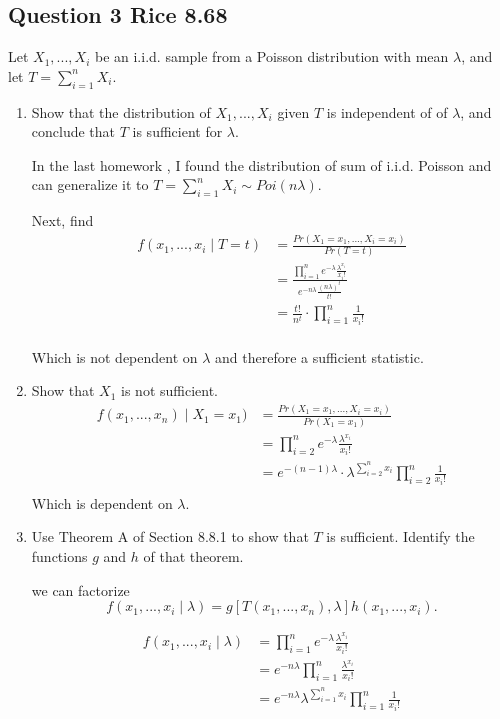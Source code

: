 \documentclass{tufte-book}
\theoremstyle{mytheoremstyle}
\theoremstyle{mylemstyle}
\theoremstyle{mydefstyle}
\begin{document}
\subsection{Question 3 Rice 8.68}
Let $X_1,...,X_i$ be an i.i.d. sample from a Poisson distribution with mean $\lambda$, and let $T=\sum_{i=1}^nX_i$.

\begin{enumerate}

\item Show that the distribution of $X_1,...,X_i$ given $T$ is independent of of $\lambda$, and conclude that $T$ is sufficient for $\lambda$.

In the last homework , I found the distribution of sum of i.i.d. Poisson and can generalize it to $T=\sum_{i=1}^nX_i \sim Poi(n\lambda)$.

Next, find
\begin{align*}
f(x_1,...,x_i\mid T=t) &= \frac{Pr(X_1=x_1,...,X_i=x_i)}{Pr(T=t)}\\
&= \frac{\prod_{i=1}^n e^{-\lambda} \frac{\lambda^{x_i}}{x_i!}}{e^{-n\lambda} \frac{(n\lambda)^t}{t!}}\\
&= \frac{t!}{n^t} \cdot \prod_{i=1}^n \frac{1}{x_i!}\\
\end{align*}

Which is not dependent on $\lambda$ and therefore a sufficient statistic.

\item Show that $X_1$ is not sufficient.
\begin{align*}
f(x_1,...,x_n) \mid X_1=x_1) &= \frac{Pr(X_1=x_1,...,X_i=x_i)}{Pr(X_1=x_1)}\\
&= \prod_{i=2}^n e^{-\lambda} \frac{\lambda^{x_i}}{x_i!}\\
&= e^{-(n-1)\lambda} \cdot \lambda^{\sum_{i=2}^n x_i} \prod_{i=2}^n \frac{1}{x_i!}\\
\end{align*}
Which is dependent on $\lambda$.

\item Use Theorem A of Section 8.8.1 to show that $T$ is sufficient.  Identify the functions $g$ and $h$ of that theorem.

 we can factorize
\[f(x_1,...,x_i \mid \lambda) = g[T(x_1,...,x_n), \lambda] h(x_1,...,x_i). \]

\begin{align*}
f(x_1,...,x_i \mid \lambda) &= \prod_{i=1}^n e^{-\lambda} \frac{\lambda^{x_i}}{x_i!}\\
&= e^{-n\lambda} \prod_{i=1}^n \frac{\lambda^{x_i}}{x_i!}\\
&= e^{-n\lambda} \lambda^{\sum_{i=1}^n x_i} \prod_{i=1}^n \frac{1}{x_i!}\\
\end{align*}


\end{enumerate}
\end{document}
